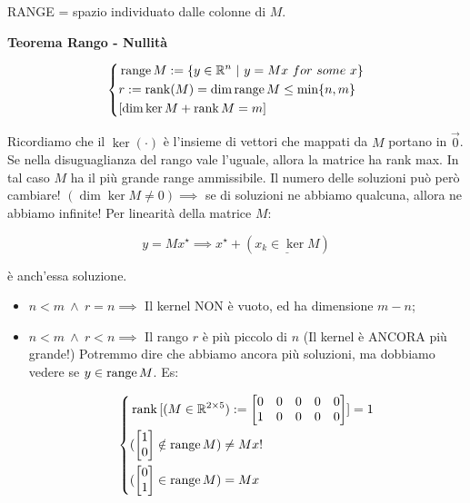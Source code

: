 RANGE = spazio individuato dalle colonne di $M$. 

\begin{thrm}{\textbf{Teorema Rango - Nullità}}

\[
	\left\{
	\begin{aligned}
	&\operatorname{range}{M} := \{y\in\mathbb{R}^n\ |\ y=Mx\ for\ some\ x\}\\
	&r := \operatorname{rank}(M) = \dim{\operatorname{range}{M}} \leq \min\{n,m\}\\
	&[\dim\ker{M} + \operatorname{rank}{M} = m]
	\end{aligned}
	\right.
\]

\end{thrm}

Ricordiamo che il $\ker{(\mathord{\cdot})}$ è l'insieme di vettori che mappati da $M$ portano in $\vec{0}$. Se nella disuguaglianza del rango vale l'uguale, allora la matrice ha rank max. In tal caso $M$ ha il più grande range ammissibile. Il numero delle soluzioni può però cambiare! $(\dim\ker{M}\neq 0)\implies$ se di soluzioni ne abbiamo qualcuna, allora ne abbiamo infinite! Per linearità della matrice $M$:

\[
	y=Mx^\star \implies x^\star + (\underline{x_k\in\ker{M}})
\]

è anch'essa soluzione.

\begin{itemize}

\item{$n<m\ \land\ r=n\implies$} Il kernel NON è vuoto, ed ha dimensione $m-n$;
\item{$n<m\ \land\ r<n\implies$} Il rango $r$ è più piccolo di $n$ (Il kernel è ANCORA più grande!) Potremmo dire che abbiamo ancora più soluzioni, ma dobbiamo vedere se $y\in\operatorname{range}{M}$. Es:

\[
	\left\{
	\begin{aligned}
	&\operatorname{rank}{[(M\in\mathbb{R}^{2\times 5}) := \begin{bmatrix}0&0&0&0&0\\1&0&0&0&0\end{bmatrix}}] = 1\\
	&(\begin{bmatrix}1\\0\end{bmatrix}\notin\operatorname{range}{M}) \neq Mx !\\
	&(\begin{bmatrix}0\\1\end{bmatrix}\in\operatorname{range}{M}) = Mx
	\end{aligned}
	\right.
\]

\end{itemize}

